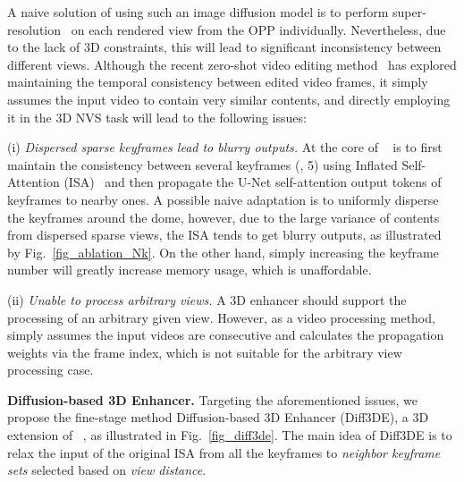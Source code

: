 A naive solution of using such an image diffusion model is to perform super-resolution~\cite{rombach2022LatentDiff,zhang2023addingControlNet} on each rendered view from the OPP individually. Nevertheless, due to the lack of 3D constraints, this will lead to significant inconsistency between different views. Although the recent zero-shot video editing method~\cite{geyer2023tokenflow} has explored maintaining the temporal consistency between edited video frames, it simply assumes the input video to contain very similar contents, and 
directly employing it in the 3D NVS task will lead to the following issues: 



(i) \textit{Dispersed sparse keyframes lead to blurry outputs.} At the core of ~\cite{geyer2023tokenflow} is to first maintain the consistency between several keyframes (\eg, 5) using Inflated Self-Attention (ISA)~\cite{wu2023tune-a-video} and then propagate the U-Net self-attention output tokens of keyframes to nearby ones. A possible naive adaptation is to uniformly disperse the keyframes around the dome, however, due to the large variance of contents from dispersed sparse views, the ISA tends to get blurry outputs, as illustrated by Fig.~\ref{fig_ablation_Nk}. On the other hand, simply increasing the keyframe number will greatly increase memory usage, which is unaffordable. 

(ii) \textit{Unable to process arbitrary views.} A 3D enhancer should support the processing of an arbitrary given view. However, as a video processing method, \cite{geyer2023tokenflow} simply assumes the input videos are consecutive and calculates the propagation weights via the frame index, which is not suitable for the arbitrary view processing case.


\vspace{0.1cm}
\noindent\textbf{Diffusion-based 3D Enhancer.} Targeting the aforementioned issues, we propose the fine-stage method Diffusion-based 3D Enhancer (Diff3DE), a 3D extension of ~\cite{geyer2023tokenflow}, as illustrated in Fig.~\ref{fig_diff3de}.  The main idea of Diff3DE is to relax the input of the original ISA from all the keyframes to \textit{neighbor keyframe sets}  selected based on \textit{view distance}.


